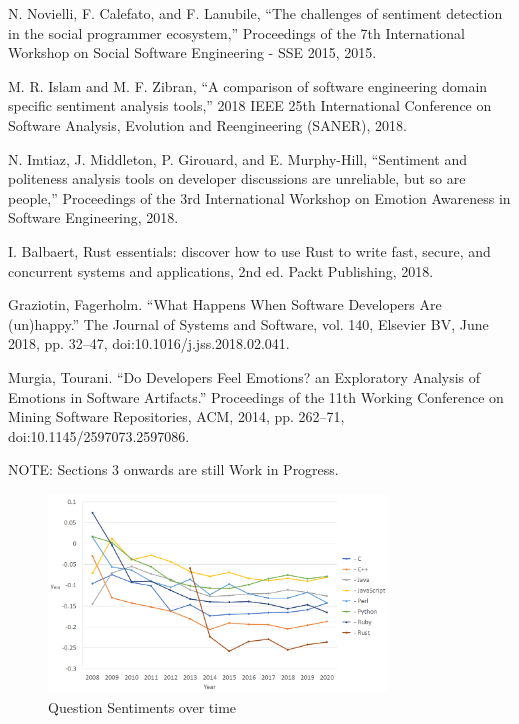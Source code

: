 \documentclass[conference]{IEEEtran}
\begin{document}
\begin{thebibliography}{00}
 N. Novielli, F. Calefato, and F. Lanubile, “The challenges of sentiment detection in the social programmer ecosystem,” Proceedings of the 7th International Workshop on Social Software Engineering - SSE 2015, 2015. 

 M. R. Islam and M. F. Zibran, “A comparison of software engineering domain specific sentiment analysis tools,” 2018 IEEE 25th International Conference on Software Analysis, Evolution and Reengineering (SANER), 2018. 

 N. Imtiaz, J. Middleton, P. Girouard, and E. Murphy-Hill, “Sentiment and politeness analysis tools on developer discussions are unreliable, but so are people,” Proceedings of the 3rd International Workshop on Emotion Awareness in Software Engineering, 2018. 

 I. Balbaert, Rust essentials: discover how to use Rust to write fast, secure, and concurrent systems and applications, 2nd ed. Packt Publishing, 2018. 

 Graziotin, Fagerholm. “What Happens When Software Developers Are (un)happy.” The Journal of Systems and Software, vol. 140, Elsevier BV, June 2018, pp. 32–47, doi:10.1016/j.jss.2018.02.041.

 Murgia, Tourani. “Do Developers Feel Emotions? an Exploratory Analysis of Emotions in Software Artifacts.” Proceedings of the 11th Working Conference on Mining Software Repositories, ACM, 2014, pp. 262–71, doi:10.1145/2597073.2597086.

\end{thebibliography}

\vspace{12pt}
\color{red}
NOTE: Sections 3 onwards are still Work in Progress.
\color{black}

\begin{figure}[htbp]
\centering
\includegraphics[width=0.8\textwidth]{figures/time_questions_em.png}
\caption{Question Sentiments over time}
\label{fig}
\end{figure}
\end{document}
